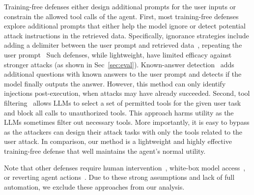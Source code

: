 Training-free defenses either design additional prompts for the user inputs or constrain the allowed tool calls of the agent. 
First, most training-free defenses explore additional prompts that either help the model ignore or detect potential attack instructions in the retrieved data.
Specifically, ignorance strategies include adding a delimiter between the user prompt and retrieved data~\cite{hines2024defending, alex2023ultimate, delimiters_url}, repeating the user prompt~\cite{learning_prompt_sandwich_url}
Such defenses, while lightweight, have limited efficacy against stronger attacks (as shown in Sec~\ref{sec:eval}).
Known-answer detection~\cite{liu2024formalizing} adds additional questions with known answers to the user prompt and detects if the model finally outputs the answer. 
However, this method can only identify injections post-execution, when attacks may have already succeeded.
Second, tool filtering~\cite{debenedetti2024agentdojo} allows LLMs to select a set of permitted tools for the given user task and block all calls to unauthorized tools.
This approach harms utility as the LLMs sometimes filter out necessary tools. 
More importantly, it is easy to bypass as the attackers can design their attack tasks with only the tools related to the user attack.  
In comparison, our method is a lightweight and highly effective training-free defense that well maintains the agent's normal utility. 

Note that other defenses require human intervention~\cite{wu2025isolategpt}, white-box model access~\cite{wu2024system}, or reverting agent actions~\cite{patil2024goex}.
Due to these strong assumptions and lack of full automation, we exclude these approaches from our analysis.
















